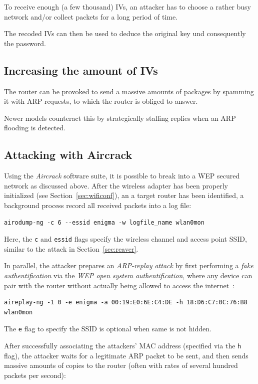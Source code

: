 To receive enough (a few thousand) IVs, an attacker has to choose a rather busy network and/or collect packets for a long period of time.

The recoded IVs can then be used to deduce the original key und consequently the password.

\subsection{Increasing the amount of IVs}

The router can be provoked to send a massive amounts of packages by spamming it with ARP requests, to which the router is obliged to answer.

Newer models counteract this by strategically stalling replies when an ARP flooding is detected.

\subsection{Attacking with Aircrack}\label{sec:wepcrack}

Using the \emph{Aircrack} software suite, it is possible to break into a WEP secured network as discussed above. After the wireless adapter has been properly initialized (see Section~\ref{sec:wificonf}), an a target router has been identified, a background process record all received packets into a log file:

\begin{lstlisting}
airodump-ng -c 6 --essid enigma -w logfile_name wlan0mon
\end{lstlisting}

Here, the \lstinline{c} and \lstinline{essid} flags specify the wireless channel and access point SSID, similar to the attack in Section~\ref{sec:reaver}.

In parallel, the attacker prepares an \emph{ARP-replay attack} by first performing a \emph{fake authentification} via the \emph{WEP open system authentification}, where any device can pair with the router without actually being allowed to access the internet~\cite{WiFi16}:

\begin{lstlisting}
aireplay-ng -1 0 -e enigma -a 00:19:E0:6E:C4:DE -h 18:D6:C7:0C:76:B8 wlan0mon
\end{lstlisting}

The \lstinline{e} flag to specify the SSID is optional when same is not hidden.

After successfully associating the attackers' MAC address (specified via the \lstinline{h} flag), the attacker waits for a legitimate ARP packet to be sent, and then sends massive amounts of copies to the router (often with rates of several hundred packets per second):

